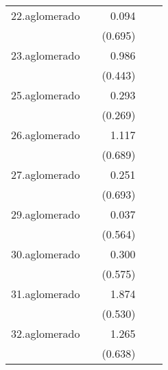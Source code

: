 {\begin{longtable}{l*{4}{D{.}{.}{-1}}}
\addlinespace
22.aglomerado&                     &       0.094         &                     &                     \\
            &                     &     (0.695)         &                     &                     \\
\addlinespace
23.aglomerado&                     &       0.986\sym{*}  &                     &                     \\
            &                     &     (0.443)         &                     &                     \\
\addlinespace
25.aglomerado&                     &       0.293         &                     &                     \\
            &                     &     (0.269)         &                     &                     \\
\addlinespace
26.aglomerado&                     &       1.117         &                     &                     \\
            &                     &     (0.689)         &                     &                     \\
\addlinespace
27.aglomerado&                     &       0.251         &                     &                     \\
            &                     &     (0.693)         &                     &                     \\
\addlinespace
29.aglomerado&                     &       0.037         &                     &                     \\
            &                     &     (0.564)         &                     &                     \\
\addlinespace
30.aglomerado&                     &       0.300         &                     &                     \\
            &                     &     (0.575)         &                     &                     \\
\addlinespace
31.aglomerado&                     &       1.874\sym{***}&                     &                     \\
            &                     &     (0.530)         &                     &                     \\
\addlinespace
32.aglomerado&                     &       1.265\sym{*}  &                     &                     \\
            &                     &     (0.638)         &                     &                     \\

\end{longtable}}
